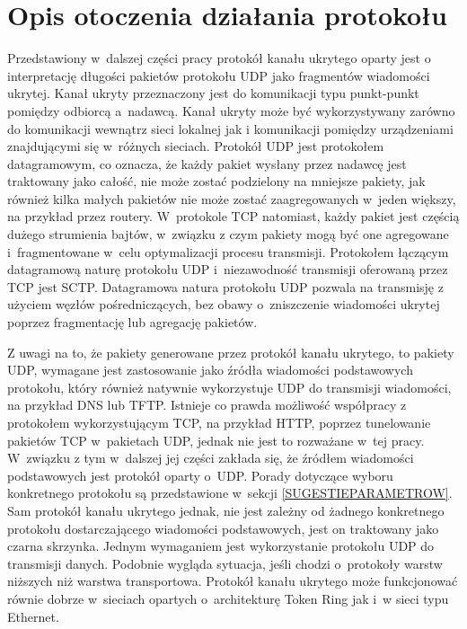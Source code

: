 \documentclass[a4paper, twoside, 12pt]{report}
\begin{document}
    \section{Opis otoczenia działania protokołu}
    Przedstawiony w~dalszej części pracy protokół kanału ukrytego oparty jest o
    interpretację długości pakietów protokołu UDP jako fragmentów wiadomości ukrytej.
    Kanał ukryty przeznaczony jest do komunikacji typu punkt-punkt pomiędzy odbiorcą a~nadawcą.
    Kanał ukryty może być wykorzystywany zarówno do komunikacji wewnątrz sieci lokalnej jak i
    komunikacji pomiędzy urządzeniami znajdującymi się w~różnych sieciach.
    Protokół UDP jest protokołem datagramowym, co
    oznacza, że każdy pakiet wysłany przez nadawcę jest traktowany jako całość, nie może zostać
    podzielony na mniejsze pakiety, jak również kilka małych pakietów nie może zostać
    zaagregowanych w~jeden większy, na przykład przez routery. W~protokole TCP natomiast,
    każdy pakiet jest częścią dużego strumienia bajtów, w~związku z czym pakiety mogą
    być one agregowane i~fragmentowane w~celu optymalizacji procesu transmisji. Protokołem
    łączącym datagramową naturę protokołu UDP i~niezawodność transmisji oferowaną przez TCP jest
    SCTP\cite{SCTPRFC}. Datagramowa natura protokołu UDP pozwala na transmisję z użyciem
    węzłów pośredniczących, bez obawy o~zniszczenie wiadomości ukrytej poprzez fragmentację
    lub agregację pakietów.

    Z uwagi na to, że pakiety generowane przez protokół kanału ukrytego, to pakiety UDP,
    wymagane jest
    zastosowanie jako źródła wiadomości podstawowych protokołu, który również
    natywnie wykorzystuje UDP do transmisji wiadomości, na przykład DNS lub TFTP.
    Istnieje co prawda możliwość współpracy z protokołem wykorzystującym TCP, na przykład HTTP,
    poprzez tunelowanie pakietów TCP w~pakietach UDP, jednak nie jest to rozważane w~tej
    pracy. W~związku z tym w~dalszej jej części zakłada się, że źródłem wiadomości
    podstawowych jest protokół oparty o~UDP. Porady dotyczące wyboru konkretnego
    protokołu są przedstawione w~sekcji \ref{SUGESTIEPARAMETROW}. Sam protokół kanału
    ukrytego jednak, nie jest zależny od żadnego konkretnego protokołu dostarczającego
    wiadomości podstawowych, jest on traktowany jako czarna skrzynka. Jednym wymaganiem
    jest wykorzystanie protokołu UDP do transmisji danych. Podobnie wygląda sytuacja,
    jeśli chodzi o~protokoły warstw niższych niż warstwa transportowa. Protokół kanału
    ukrytego może funkcjonować równie dobrze w~sieciach opartych o~architekturę
    Token Ring jak i~w sieci typu Ethernet.
\end{document}

